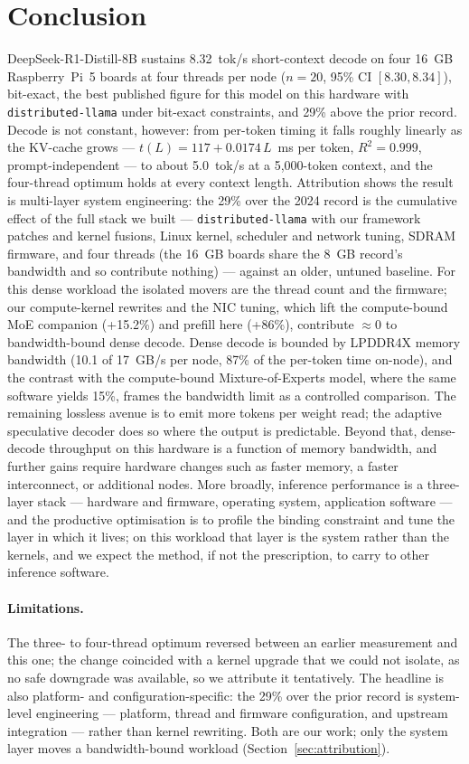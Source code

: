 \documentclass[10pt,a4paper]{article}
\begin{document}
\section{Conclusion}
DeepSeek-R1-Distill-8B sustains 8.32~tok/s short-context decode on four 16~GB Raspberry~Pi~5 boards at four threads per node ($n{=}20$, 95\% CI $[8.30,8.34]$), bit-exact, the best published figure for this model on this hardware with \texttt{distributed-llama} under bit-exact constraints, and 29\% above the prior record. Decode is not constant, however: from per-token timing it falls roughly linearly as the KV-cache grows --- $t(L){=}117{+}0.0174\,L$~ms per token, $R^2{=}0.999$, prompt-independent --- to about 5.0~tok/s at a 5{,}000-token context, and the four-thread optimum holds at every context length. Attribution shows the result is multi-layer system engineering: the 29\% over the 2024 record is the cumulative effect of the full stack we built --- \texttt{distributed-llama} with our framework patches and kernel fusions, Linux kernel, scheduler and network tuning, SDRAM firmware, and four threads (the 16~GB boards share the 8~GB record's bandwidth and so contribute nothing) --- against an older, untuned baseline. For this dense workload the isolated movers are the thread count and the firmware; our compute-kernel rewrites and the NIC tuning, which lift the compute-bound MoE companion (+15.2\%) and prefill here (+86\%), contribute $\approx$0 to bandwidth-bound dense decode. Dense decode is bounded by LPDDR4X memory bandwidth (10.1 of 17~GB/s per node, 87\% of the per-token time on-node), and the contrast with the compute-bound Mixture-of-Experts model, where the same software yields 15\%, frames the bandwidth limit as a controlled comparison. The remaining lossless avenue is to emit more tokens per weight read; the adaptive speculative decoder does so where the output is predictable. Beyond that, dense-decode throughput on this hardware is a function of memory bandwidth, and further gains require hardware changes such as faster memory, a faster interconnect, or additional nodes. More broadly, inference performance is a three-layer stack --- hardware and firmware, operating system, application software --- and the productive optimisation is to profile the binding constraint and tune the layer in which it lives; on this workload that layer is the system rather than the kernels, and we expect the method, if not the prescription, to carry to other inference software.

\paragraph{Limitations.} The three- to four-thread optimum reversed between an earlier measurement and this one; the change coincided with a kernel upgrade that we could not isolate, as no safe downgrade was available, so we attribute it tentatively. The headline is also platform- and configuration-specific: the 29\% over the prior record is system-level engineering --- platform, thread and firmware configuration, and upstream integration --- rather than kernel rewriting. Both are our work; only the system layer moves a bandwidth-bound workload (Section~\ref{sec:attribution}).
\end{document}
